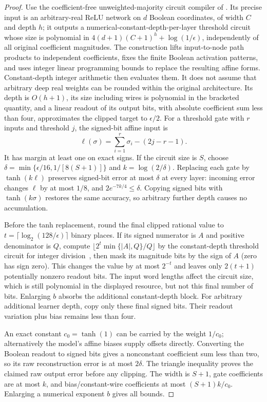\begin{proof}
Use the coefficient-free unweighted-majority circuit compiler of
\cite{booleancompiler}. Its precise input is an arbitrary-real ReLU
network on $d$ Boolean coordinates, of width $C$ and depth $h$; it outputs
a numerical-constant-depth-per-layer threshold circuit whose size is
polynomial in $4(d+1)(C+1)^h+\log(1/\epsilon)$, independently of all
original coefficient magnitudes.  The construction lifts input-to-node
path products to independent coefficients, fixes the finite Boolean
activation patterns, and uses integer linear programming bounds to
replace the resulting affine forms.  Constant-depth integer arithmetic
then evaluates them.  It does not assume that arbitrary deep real weights
can be rounded within the original architecture.  Its depth
is $O(h+1)$, its size including wires is polynomial in the bracketed
quantity, and a linear readout of its output bits, with absolute
coefficient sum less than four, approximates the clipped target to
$\epsilon/2$.  For a threshold gate with $r$ inputs and threshold $j$,
the signed-bit affine input is
\[
 \ell(\sigma)=\sum_{i=1}^r\sigma_i-(2j-r-1).
\]
It has margin at least one on exact signs.  If the circuit size is $S$,
choose $\delta=\min\{\epsilon/16,1/[8(S+1)]\}$ and
$k=\log(2/\delta)$.  Replacing each gate by $\tanh(k\ell)$ preserves
signed-bit error at most $\delta$ at every layer: incoming error changes
$\ell$ by at most $1/8$, and $2e^{-7k/4}\le\delta$.
Copying signed bits with $\tanh(k\sigma)$ restores the same accuracy, so
arbitrary further depth causes no accumulation.

Before the tanh replacement, round the final clipped rational value to
$t=\lceil\log_2(128/\epsilon)\rceil$ binary places. If its signed
numerator is $A$ and positive denominator is $Q$, compute
$\lfloor2^t\min\{|A|,Q\}/Q\rfloor$ by the constant-depth threshold
circuit for integer division~\cite{hab}, then mask its magnitude bits
by the sign of $A$ (zero has sign zero).  This changes the value by at
most $2^{-t}$ and leaves only $2(t+1)$ potentially nonzero readout bits.
The input word lengths affect the circuit size, which is still polynomial
in the displayed resource, but not this final number of bits.  Enlarging
$b$ absorbs the additional constant-depth block.  For arbitrary additional
learner depth, copy only these final signed bits.  Their readout variation
plus bias remains less than four.

An exact constant $c_0=\tanh(1)$ can be carried by the weight $1/c_0$;
alternatively the model's affine biases supply offsets directly.
Converting the Boolean readout to signed bits gives a nonconstant
coefficient sum less than two, so its raw reconstruction error is at
most $2\delta$.  The triangle inequality proves the claimed raw output
error before any clipping.  The width is $S+1$, gate coefficients are
at most $k$, and bias/constant-wire coefficients at most $(S+1)k/c_0$.
Enlarging a numerical exponent $b$ gives all bounds.
\end{proof}

